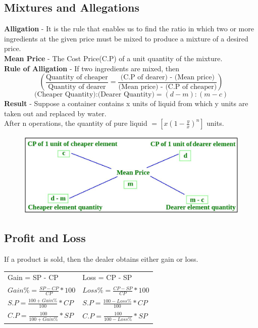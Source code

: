 \subsection{Mixtures and Allegations}
\textbf{Alligation} - It is the rule that enables us to find the ratio in which two or more ingredients at the given price must be mixed to produce a mixture of a desired price.\\
\textbf{Mean Price} - The Cost Price(C.P) of a unit quantity of the mixture.\\
\textbf{Rule of Alligation} - If two ingredients are mixed, then
\[\left(\frac{\text{Quantity of cheaper}}{\text{Quantity of dearer}} = \frac{\text{(C.P of dearer) - (Mean price)}}{\text{(Mean price) - (C.P of cheaper)}}\right)\]
\[\text{(Cheaper Quantity):(Dearer Quantity)}=(d-m):(m-c)\]
\textbf{Result} - Suppose a container contains x units of liquid from which y units are taken out and replaced by water.\\
After n operations, the quantity of pure liquid \( = \left[x\left(1-\frac{y}{x} \right)^n \right]\) units.
\begin{figure}[h!]
    \centering
    \includegraphics[width=\linewidth]{images/alligation.png}
\end{figure}


\subsection{Profit and Loss}
If a product is sold, then the dealer obtains either gain or loss.
\begin{table}[h!]
    \centering
    \setlength{\tabcolsep}{3em}
    \tabulinesep=3mm
    \begin{tabu}{l l}
    Gain = SP - CP                    & Loss = CP - SP                    \\
    \(Gain\% = \frac{SP-CP}{CP}*100\) & \(Loss\%=\frac{CP-SP}{CP}*100\)   \\
    \(S.P=\frac{100+Gain\%}{100}*CP\) & \(S.P=\frac{100-Loss\%}{100}*CP\) \\
    \(C.P=\frac{100}{100+Gain\%}*SP\) & \(C.P=\frac{100}{100-Loss\%}*SP\)
    \end{tabu}
\end{table}

